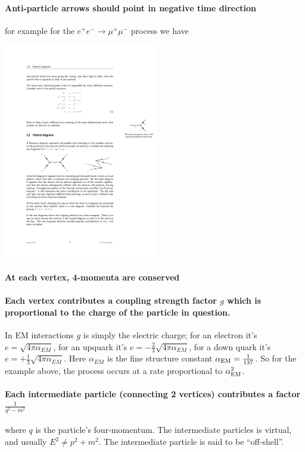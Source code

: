 \paragraph{Anti-particle arrows should point in negative time direction} for example for the $e^+e^-\to \mu^+\mu^-$ process we have
\begin{center}
\includegraphics[width=0.5\textwidth]{fig/forcerange/eetomm.pdf}
\end{center}

\paragraph{At each vertex, 4-momenta are conserved}

\paragraph{Each vertex contributes a coupling strength factor $g$ which is proportional to the charge of the particle in question.}
In EM interactions $g$ is simply the electric charge; for an electron it's $e=\sqrt{4\pi\alpha_{EM}}$, for an upquark it's $e= - \frac{2}{3}\sqrt{4\pi\alpha_{EM}}$, for a down quark it's $e= + \frac{1}{3}\sqrt{4\pi\alpha_{EM}}$. Here $\alpha_{EM}$ is the fine structure constant $\alpha_{\rm EM}=\frac{1}{137}$. So for the example above, the process occurs at a rate proportional to $\alpha_{\rm EM}^2$.

\paragraph{Each intermediate particle (connecting 2 vertices) contributes a factor $\frac{1}{q^2 - m^2}$} where $q$ is the particle's four-momentum. The intermediate particles is virtual, and usually $E^2 \neq p^2+m^{2}$. The intermediate particle is said to be ``off-shell''. 

